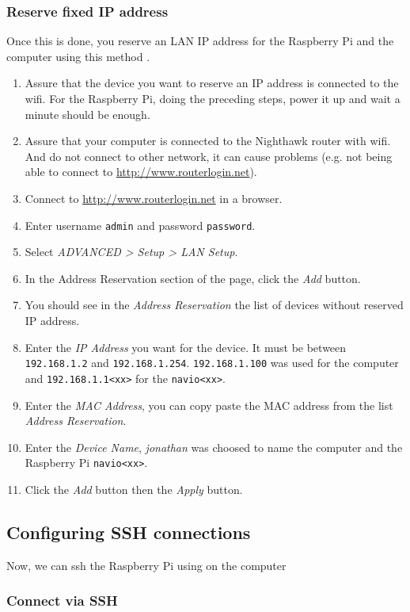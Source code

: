 \subsubsection{Reserve fixed IP address}
Once this is done, you reserve an LAN IP address for the Raspberry Pi and the computer using this method \cite{netgear_reserve_ip}.
\begin{enumerate}
    \item Assure that the device you want to reserve an IP address is connected to the wifi. For the Raspberry Pi, doing the preceding steps, power it up and wait a minute should be enough.
    \item Assure that your computer is connected to the Nighthawk router with wifi. And do not connect to other network, it can cause problems (e.g. not being able to connect to \url{http://www.routerlogin.net}).
    \item Connect to \url{http://www.routerlogin.net} in a browser.
    \item Enter username \texttt{admin} and password \texttt{password}.
    \item Select \emph{ADVANCED > Setup > LAN Setup}.
    \item In the Address Reservation section of the page, click the \emph{Add} button.
    \item You should see in the \emph{Address Reservation} the list of devices without reserved IP address.
    \item Enter the \emph{IP Address} you want for the device. It must be between \texttt{192.168.1.2} and \texttt{192.168.1.254}. \texttt{192.168.1.100} was used for the computer and \texttt{192.168.1.1<xx>} for the \texttt{navio<xx>}.
    \item Enter the \emph{MAC Address}, you can copy paste the MAC address from the list \emph{Address Reservation}.
    \item Enter the \emph{Device Name}, \emph{jonathan} was choosed to name the computer and the Raspberry Pi \texttt{navio<xx>}.
    \item Click the \emph{Add} button then the \emph{Apply} button.
\end{enumerate}

\subsection{Configuring SSH connections}
Now, we can ssh the Raspberry Pi using on the computer
\subsubsection{Connect via SSH}

